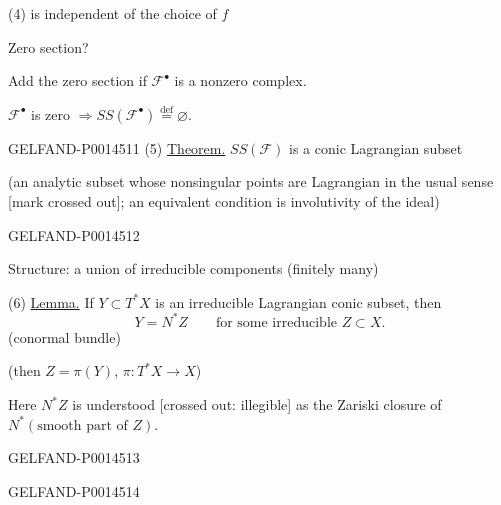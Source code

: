 (4) is independent of the choice of \(f\)

Zero section?

Add the zero section if \(\mathcal F^{\bullet}\) is a nonzero complex.

\(\mathcal F^{\bullet}\) is zero
\(\Rightarrow SS(\mathcal F^{\bullet})\overset{\mathrm{def}}{=}\varnothing\).


\begin{GelfandAdjacentEvidence}{GELFAND-P001451}{1}
(5) \uline{Theorem.}
\(SS(\mathcal{F})\) is a conic Lagrangian subset

(an analytic subset whose nonsingular points are Lagrangian in the usual sense [mark crossed out]; an equivalent condition is involutivity of the ideal)
\end{GelfandAdjacentEvidence}
\begin{GelfandAdjacentEvidence}{GELFAND-P001451}{2}


Structure: a union of irreducible components (finitely many)

(6) \uline{Lemma.}
If \(Y\subset T^{*}X\) is an irreducible Lagrangian conic subset, then
\begin{equation*}
Y=N^{*}Z\qquad
\text{for some irreducible } Z\subset X. \tag{7}
\end{equation*}
(conormal bundle)

(then \(Z=\pi(Y)\), \(\pi\colon T^{*}X\longrightarrow X\))

Here \(N^{*}Z\) is understood [crossed out: illegible]
as the Zariski closure of \(N^{*}(\text{smooth part of }Z)\).
\end{GelfandAdjacentEvidence}
\begin{GelfandAdjacentEvidence}{GELFAND-P001451}{3}

\end{GelfandAdjacentEvidence}
\begin{GelfandAdjacentEvidence}{GELFAND-P001451}{4}


\end{GelfandAdjacentEvidence}

